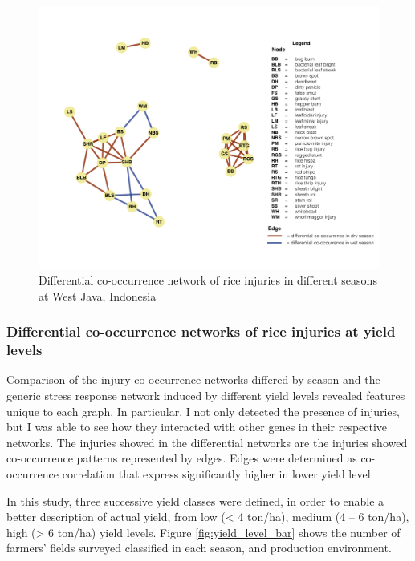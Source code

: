 \begin{figure}
\centering
\includegraphics[width = 1\textwidth]{figures/difseasonWJ/difseasonWJ.pdf}
\caption{Differential co-occurrence network of rice injuries in different seasons at West Java, Indonesia}
\label{fig:difseasonnetwork_WJ}
\end{figure}

\subsubsection{Differential co-occurrence networks of rice injuries at yield levels}

Comparison of the injury co-occurrence networks differed by season and the generic stress response network induced by different yield levels revealed features unique to each graph. In particular, I not only detected the presence of injuries, but I was able to see how they interacted with other genes in their respective networks. 
The injuries showed in the differential networks are the injuries showed co-occurrence patterns represented by edges. Edges were determined as co-occurrence correlation that express significantly higher in lower yield level. 

In this study, three successive yield classes were defined, in order to enable a better description of actual yield, from low (< 4 ton/ha), medium (4 – 6 ton/ha),  high (> 6 ton/ha) yield levels. Figure \ref{fig:yield_level_bar} shows the number of farmers’ fields surveyed classified in each season, and production environment.

